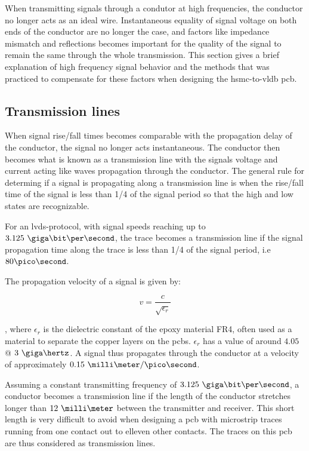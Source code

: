 \documentclass[main.tex]{subfiles}
\begin{document}
When transmitting signals through a condutor at high frequencies, the conductor no longer acts as an ideal wire. Instantaneous equality of signal voltage on both ends of the conductor are no longer the case, and factors like impedance mismatch and reflections becomes important for the quality of the signal to remain the same through the whole transmission. This section gives a brief explanation of high frequency signal behavior and the methods that was practiced to compensate for these factors when designing the \gls{hsmc}-to-\gls{vldb} \gls{pcb}.


\subsection{Transmission lines}

When signal rise/fall times becomes comparable with the propagation delay of the conductor, the signal no longer acts instantaneous. The conductor then becomes what is known as a transmission line with the signals voltage and current acting like waves propagation through the conductor. 
The general rule for determing if a signal is propagating along a transmission line is when the rise/fall time of the signal is less than 1/4 of the signal period so that the high and low states are recognizable. \cite{weste11} 

For an \gls{lvds}-protocol, with signal speeds reaching up to $3.125\ \giga\bit\per\second$, the trace becomes a transmission line if the signal propagation time along the trace is less than 1/4 of the signal period, i.e $80\pico\second$. 

The propagation velocity of a signal is given by:

\begin{equation}
    v = \frac{c}{\sqrt{\epsilon_r}}
\end{equation}

, where $\epsilon_r$ is the dielectric constant of the epoxy material FR4, often used as a material to separate the copper layers on the \glspl{pcb}. $\epsilon_r$ has a value of around $4.05$ @ $3\ \giga\hertz$. \cite{polar15}
A signal thus propagates through the conductor at a velocity of approximately $0.15\ \milli\meter/\pico\second$. \cite[example 13.7]{weste11}

Assuming a constant transmitting frequency of $3.125\ \giga\bit\per\second$, a conductor becomes a transmission line if the length of the conductor stretches longer than $12\ \milli\meter$ between the transmitter and receiver. This short length is very difficult to avoid when designing a \gls{pcb} with microstrip traces running from one contact out to elleven other contacts. The traces on this \gls{pcb} are thus considered as transmission lines. 
\end{document}
